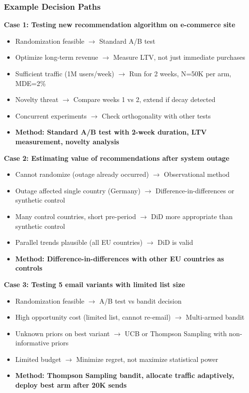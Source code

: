 \subsubsection{Example Decision Paths}

\textbf{Case 1: Testing new recommendation algorithm on e-commerce site}
\begin{itemize}
    \item Randomization feasible $\rightarrow$ Standard A/B test
    \item Optimize long-term revenue $\rightarrow$ Measure LTV, not just immediate purchases
    \item Sufficient traffic (1M users/week) $\rightarrow$ Run for 2 weeks, N=50K per arm, MDE=2\%
    \item Novelty threat $\rightarrow$ Compare weeks 1 vs 2, extend if decay detected
    \item Concurrent experiments $\rightarrow$ Check orthogonality with other tests
    \item \textbf{Method: Standard A/B test with 2-week duration, LTV measurement, novelty analysis}
\end{itemize}

\textbf{Case 2: Estimating value of recommendations after system outage}
\begin{itemize}
    \item Cannot randomize (outage already occurred) $\rightarrow$ Observational method
    \item Outage affected single country (Germany) $\rightarrow$ Difference-in-differences or synthetic control
    \item Many control countries, short pre-period $\rightarrow$ DiD more appropriate than synthetic control
    \item Parallel trends plausible (all EU countries) $\rightarrow$ DiD is valid
    \item \textbf{Method: Difference-in-differences with other EU countries as controls}
\end{itemize}

\textbf{Case 3: Testing 5 email variants with limited list size}
\begin{itemize}
    \item Randomization feasible $\rightarrow$ A/B test vs bandit decision
    \item High opportunity cost (limited list, cannot re-email) $\rightarrow$ Multi-armed bandit
    \item Unknown priors on best variant $\rightarrow$ UCB or Thompson Sampling with non-informative priors
    \item Limited budget $\rightarrow$ Minimize regret, not maximize statistical power
    \item \textbf{Method: Thompson Sampling bandit, allocate traffic adaptively, deploy best arm after 20K sends}
\end{itemize}

